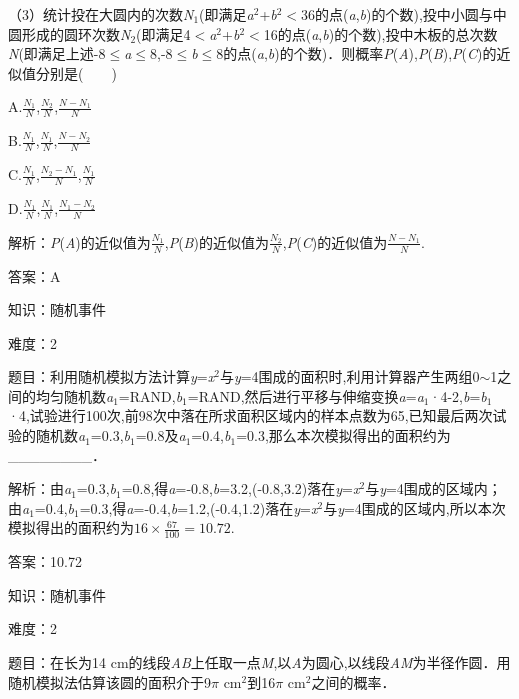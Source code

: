 \documentclass{article} %
\begin{document}
（3）统计投在大圆内的次数\textit{N}${}_{1}$(即满足\textit{a}${}^{2}$+\textit{b}${}^{2}$$\mathrm{<}$36的点(\textit{a},\textit{b})的个数),投中小圆与中圆形成的圆环次数\textit{N}${}_{2}$(即满足4$\mathrm{<}$\textit{a}${}^{2}$+\textit{b}${}^{2}$$\mathrm{<}$16的点(\textit{a},\textit{b})的个数),投中木板的总次数\textit{N}(即满足上述-8$\mathrm{\le}$\textit{a}$\mathrm{\le}$8,-8$\mathrm{\le}$\textit{b}$\mathrm{\le}$8的点(\textit{a},\textit{b})的个数)．则概率\textit{P}(\textit{A}),\textit{P}(\textit{B}),\textit{P}(\textit{C})的近似值分别是(　　)

A.$\frac{N_1}{N}$,$\frac{N_2}{N}$,$\frac{N-N_1}{N}$

B.$\frac{N_1}{N}$,$\frac{N_1}{N}$,$\frac{N-N_2}{N}$

C.$\frac{N_1}{N}$,$\frac{N_2-N_1}{N}$,$\frac{N_1}{N}$

D.$\frac{N_1}{N}$,$\frac{N_1}{N}$,$\frac{N_1-N_2}{N}$

解析：\textit{P}(\textit{A})的近似值为$\frac{N_1}{N}$,\textit{P}(\textit{B})的近似值为$\frac{N_2}{N}$,\textit{P}(\textit{C})的近似值为$\frac{N-N_1}{N}$.

答案：A

知识：随机事件

难度：2

题目：利用随机模拟方法计算\textit{y}=\textit{x}${}^{2}$与\textit{y}=4围成的面积时,利用计算器产生两组0$\sim$1之间的均匀随机数\textit{a}${}_{1}$=RAND,\textit{b}${}_{1}$=RAND,然后进行平移与伸缩变换\textit{a}=\textit{a}${}_{1}$·4-2,\textit{b}=\textit{b}${}_{1}$·4,试验进行100次,前98次中落在所求面积区域内的样本点数为65,已知最后两次试验的随机数\textit{a}${}_{1}$=0.3,\textit{b}${}_{1}$=0.8及\textit{a}${}_{1}$=0.4,\textit{b}${}_{1}$=0.3,那么本次模拟得出的面积约为\_\_\_\_\_\_\_\_．

解析：由\textit{a}${}_{1}$=0.3,\textit{b}${}_{1}$=0.8,得\textit{a}=-0.8,\textit{b}=3.2,(-0.8,3.2)落在\textit{y}=\textit{x}${}^{2}$与\textit{y}=4围成的区域内；由\textit{a}${}_{1}$=0.4,\textit{b}${}_{1}$=0.3,得\textit{a}=-0.4,\textit{b}=1.2,(-0.4,1.2)落在\textit{y}=\textit{x}${}^{2}$与\textit{y}=4围成的区域内,所以本次模拟得出的面积约为$16\times\frac{67}{100}=10.72$.

答案：10.72

知识：随机事件

难度：2

题目：在长为14 cm的线段\textit{AB}上任取一点\textit{M},以\textit{A}为圆心,以线段\textit{AM}为半径作圆．用随机模拟法估算该圆的面积介于9$\pi$ cm${}^{2}$到16$\pi$ cm${}^{2}$之间的概率．
\end{document}
